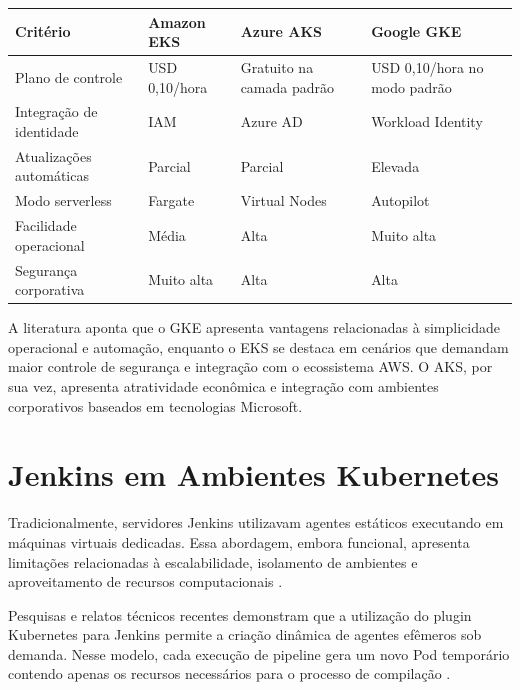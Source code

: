 \begin{table}[htbp]
\centering
{}
\label{tab:comparativo-cloud}
\begin{tabular}{|p{4cm}|p{3cm}|p{3cm}|p{3cm}|}
\hline
\textbf{Critério} & \textbf{Amazon EKS} & \textbf{Azure AKS} & \textbf{Google GKE} \\
\hline
Plano de controle & USD 0,10/hora & Gratuito na camada padrão & USD 0,10/hora no modo padrão \\
\hline
Integração de identidade & IAM & Azure AD & Workload Identity \\
\hline
Atualizações automáticas & Parcial & Parcial & Elevada \\
\hline
Modo serverless & Fargate & Virtual Nodes & Autopilot \\
\hline
Facilidade operacional & Média & Alta & Muito alta \\
\hline
Segurança corporativa & Muito alta & Alta & Alta \\
\hline
\end{tabular}
\end{table}

A literatura aponta que o GKE apresenta vantagens relacionadas à simplicidade operacional e automação, enquanto o EKS se destaca em cenários que demandam maior controle de segurança e integração com o ecossistema AWS. O AKS, por sua vez, apresenta atratividade econômica e integração com ambientes corporativos baseados em tecnologias Microsoft.

\section{Jenkins em Ambientes Kubernetes}
\label{sec:jenkins-kubernetes-relacionados}

Tradicionalmente, servidores Jenkins utilizavam agentes estáticos executando em máquinas virtuais dedicadas. Essa abordagem, embora funcional, apresenta limitações relacionadas à escalabilidade, isolamento de ambientes e aproveitamento de recursos computacionais \cite{jenkinskubernetes,squareops2024}.

Pesquisas e relatos técnicos recentes demonstram que a utilização do plugin Kubernetes para Jenkins permite a criação dinâmica de agentes efêmeros sob demanda. Nesse modelo, cada execução de pipeline gera um novo Pod temporário contendo apenas os recursos necessários para o processo de compilação \cite{spacelift2024,stackademic2024}.

